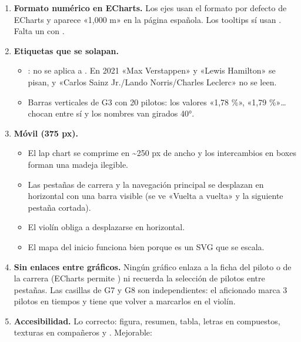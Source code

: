 \begin{enumerate}
\begin{itemize}
\item En telemetría (G10) la velocidad empieza en 0 km/h y la mitad inferior del panel queda vacía.
\end{itemize}
\item \textbf{Formato numérico en ECharts.} Los ejes usan el formato por defecto de ECharts y aparece «1,000 m» en la página española. Los tooltips sí usan . Falta un  con .
\item \textbf{Etiquetas que se solapan.}
\begin{itemize}
\item {}:  no se aplica a . En 2021 «Max Verstappen» y «Lewis Hamilton» se pisan, y «Carlos Sainz Jr./Lando Norris/Charles Leclerc» no se leen.
\item Barras verticales de G3 con 20 pilotos: los valores «1,78 \%», «1,79 \%»… chocan entre sí y los nombres van girados 40°.
\end{itemize}
\item \textbf{Móvil (375 px).}
\begin{itemize}
\item El lap chart se comprime en \textasciitilde{}250 px de ancho y los intercambios en boxes forman una madeja ilegible.
\item Las pestañas de carrera y la navegación principal se desplazan en horizontal con una barra visible (se ve «Vuelta a vuelta» y la siguiente pestaña cortada).
\item El violín obliga a desplazarse en horizontal.
\item El mapa del inicio funciona bien porque es un SVG que se escala.
\end{itemize}
\item \textbf{Sin enlaces entre gráficos.} Ningún gráfico enlaza a la ficha del piloto o de la carrera (ECharts permite ) ni recuerda la selección de pilotos entre pestañas. Las casillas de G7 y G8 son independientes: el aficionado marca 3 pilotos en tiempos y tiene que volver a marcarlos en el violín.
\item \textbf{Accesibilidad.} Lo correcto: figura, resumen, tabla, letras en compuestos, texturas en compañeros y . Mejorable:
\begin{itemize}

\end{itemize}
\end{enumerate}

